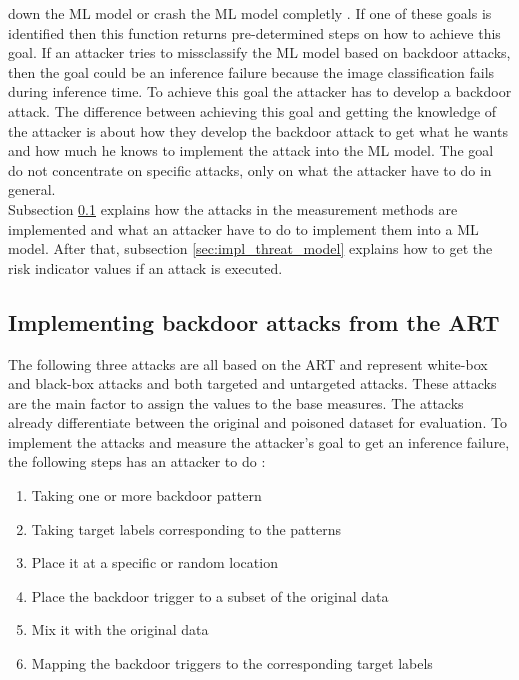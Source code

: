 down the ML model or crash the ML model completly \cite{DBLP:journals/sensors/VaccariAC20}. If one of these goals is identified then this function returns pre-determined steps on how to achieve this goal. If an attacker tries to missclassify the ML model based on backdoor attacks, then the goal could be an inference failure because the image classification fails during inference time. To achieve this goal the attacker has to develop a backdoor attack. The difference between achieving this goal and getting the knowledge of the attacker is about how they develop the backdoor attack to get what he wants and how much he knows to implement the attack into the ML model. The goal do not concentrate on specific attacks, only on what the attacker have to do in general. \\
Subsection \ref{sec:impl_backdoor_attacks} explains how the attacks in the measurement methods are implemented and what an attacker have to do to implement them into a ML model. After that, subsection \ref{sec:impl_threat_model} explains how to get the risk indicator values if an attack is executed.

\subsection{Implementing backdoor attacks from the ART}
\label{sec:impl_backdoor_attacks}

The following three attacks are all based on the ART \cite{art2018} and represent white-box and black-box attacks and both targeted and untargeted attacks. These attacks are the main factor to assign the values to the base measures. The attacks already differentiate between the original and poisoned dataset for evaluation. To implement the attacks and measure the attacker's goal to get an inference failure, the following steps has an attacker to do \cite{DBLP:journals/corr/abs-2003-03675}: \\

\begin{enumerate}
  \item Taking one or more backdoor pattern
  \item Taking target labels corresponding to the patterns
  \item Place it at a specific or random location
  \item Place the backdoor trigger to a subset of the original data
  \item Mix it with the original data
  \item Mapping the backdoor triggers to the corresponding target labels
\end{enumerate}

